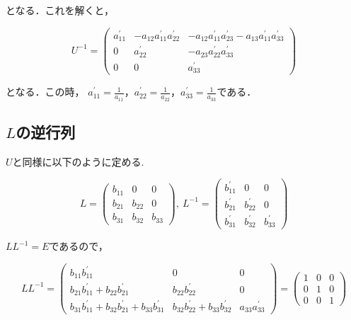 \documentclass[dvipdfmx,titlepage]{jsarticle}
\begin{document}
となる．これを解くと，

\begin{equation*}
	U^{-1} = \left(
	\begin{array}{ccc}
		a_{11}^{\prime} & -a_{12}a_{11}^{\prime}a_{22}^{\prime} & -a_{12}a_{11}^{\prime}a_{23}^{\prime} - a_{13}a_{11}^{\prime}a_{33}^{\prime} \\
		0 & a_{22}^{\prime} & -a_{23}a_{22}^{\prime}a_{33}^{\prime} \\
		0 & 0 & a_{33}^{\prime}
	\end{array}
	\right)
\end{equation*}

となる．この時，
	$\displaystyle a_{11}^{\prime} = \frac{1}{a_{11}}，
	a_{22}^{\prime} = \frac{1}{a_{22}}，
	a_{33}^{\prime} = \frac{1}{a_{33}}$である．

\subsection*{$L$の逆行列}
$U$と同様に以下のように定める.

\begin{equation*}
	L = \left(
	\begin{array}{ccc}
		b_{11} & 0 & 0 \\
		b_{21} & b_{22} & 0 \\
		b_{31} & b_{32} & b_{33}
	\end{array}
	\right), \
	L^{-1} = \left(
	\begin{array}{ccc}
		b_{11}^{\prime} & 0 & 0 \\
		b_{21}^{\prime} & b_{22}^{\prime} & 0 \\
		b_{31}^{\prime} & b_{32}^{\prime} & b_{33}^{\prime}
	\end{array}
	\right)
\end{equation*}

$LL^{-1}=E$であるので，
                
\begin{equation*}
	LL^{-1} = \left(
	\begin{array}{ccc}
		b_{11}b_{11}^{\prime} & 0 & 0 \\
		b_{21}b_{11}^{\prime} + b_{22}b_{21}^{\prime} & b_{22}b_{22}^{\prime} & 0 \\
		b_{31}b_{11}^{\prime} + b_{32}b_{21}^{\prime} + b_{33}b_{31}^{\prime} & b_{32}b_{22}^{\prime} + b_{33}b_{32}^{\prime} & a_{33}a_{33}^{\prime}
	\end{array}
	\right) = \left(
	\begin{array}{ccc}
		1 & 0 & 0 \\
		0 & 1 & 0 \\
		0 & 0 & 1
	\end{array}
	\right)
\end{equation*}
\end{document}
